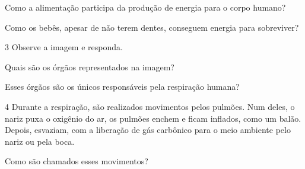 \begin{escolha}
\item Como a alimentação participa da produção de energia para o corpo humano?



\item Como os bebês, apesar de não terem dentes, conseguem energia para
sobreviver?


\end{escolha}

\num{3} Observe a imagem e responda.


\begin{escolha}
\item Quais são os órgãos representados na imagem?



\item Esses órgãos são os únicos responsáveis pela respiração humana?


\end{escolha}

\num{4} Durante a respiração, são realizados movimentos pelos
pulmões. Num deles, o nariz puxa o oxigênio do ar, os pulmões enchem e
ficam inflados, como um balão. Depois, esvaziam, com a liberação de gás
carbônico para o meio ambiente pelo nariz ou pela boca.

Como são chamados esses movimentos?



